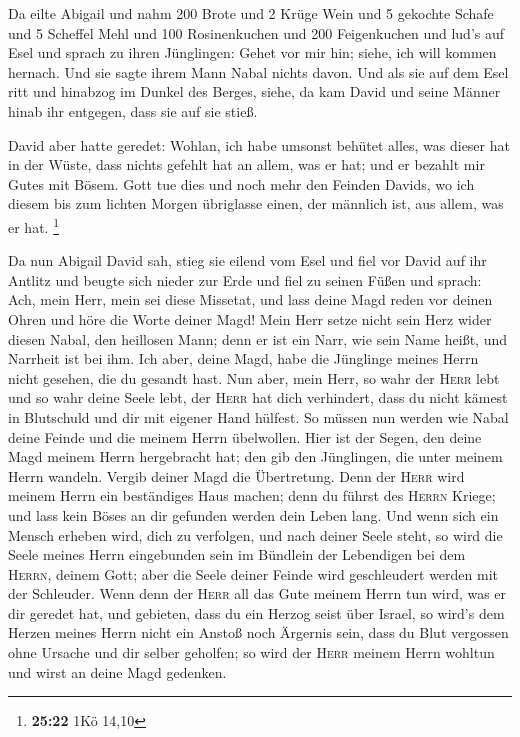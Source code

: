  Da eilte Abigail und nahm 200 Brote und 2 Krüge Wein und
5 gekochte Schafe und 5 Scheffel Mehl und 100 Rosinenkuchen und 200
Feigenkuchen und lud's auf Esel  und sprach zu ihren
Jünglingen: Gehet vor mir hin; siehe, ich will kommen hernach. Und sie
sagte ihrem Mann Nabal nichts davon.  Und als sie auf dem
Esel ritt und hinabzog im Dunkel des Berges, siehe, da kam David und
seine Männer hinab ihr entgegen, dass sie auf sie stieß.

 David aber hatte geredet: Wohlan, ich habe umsonst
behütet alles, was dieser hat in der Wüste, dass nichts gefehlt hat an
allem, was er hat; und er bezahlt mir Gutes mit Bösem. 
Gott tue dies und noch mehr den Feinden Davids, wo ich diesem bis zum
lichten Morgen übriglasse einen, der männlich ist, aus allem, was er
hat. \footnote{\textbf{25:22} 1Kö 14,10}

 Da nun Abigail David sah, stieg sie eilend vom Esel und
fiel vor David auf ihr Antlitz und beugte sich nieder zur Erde
 und fiel zu seinen Füßen und sprach: Ach, mein Herr,
mein sei diese Missetat, und lass deine Magd reden vor deinen Ohren und
höre die Worte deiner Magd!  Mein Herr setze nicht sein
Herz wider diesen Nabal, den heillosen Mann; denn er ist ein Narr, wie
sein Name heißt, und Narrheit ist bei ihm. Ich aber, deine Magd, habe
die Jünglinge meines Herrn nicht gesehen, die du gesandt hast.
 Nun aber, mein Herr, so wahr der \textsc{Herr} lebt und
so wahr deine Seele lebt, der \textsc{Herr} hat dich verhindert, dass du
nicht kämest in Blutschuld und dir mit eigener Hand hülfest. So müssen
nun werden wie Nabal deine Feinde und die meinem Herrn übelwollen.
 Hier ist der Segen, den deine Magd meinem Herrn
hergebracht hat; den gib den Jünglingen, die unter meinem Herrn wandeln.
 Vergib deiner Magd die Übertretung. Denn der
\textsc{Herr} wird meinem Herrn ein beständiges Haus machen; denn du
führst des \textsc{Herrn} Kriege; und lass kein Böses an dir gefunden
werden dein Leben lang.  Und wenn sich ein Mensch erheben
wird, dich zu verfolgen, und nach deiner Seele steht, so wird die Seele
meines Herrn eingebunden sein im Bündlein der Lebendigen bei dem
\textsc{Herrn}, deinem Gott; aber die Seele deiner Feinde wird
geschleudert werden mit der Schleuder.  Wenn denn der
\textsc{Herr} all das Gute meinem Herrn tun wird, was er dir geredet
hat, und gebieten, dass du ein Herzog seist über Israel, 
so wird's dem Herzen meines Herrn nicht ein Anstoß noch Ärgernis sein,
dass du Blut vergossen ohne Ursache und dir selber geholfen; so wird der
\textsc{Herr} meinem Herrn wohltun und wirst an deine Magd gedenken.

